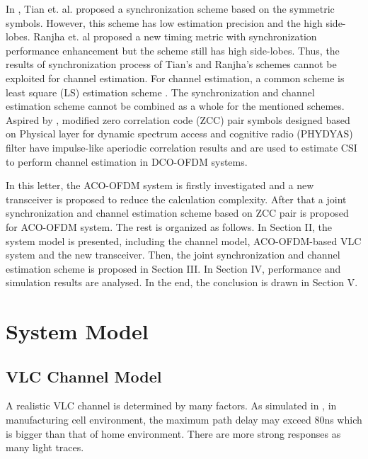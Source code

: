 \documentclass[10pt,journal]{IEEEtran}
\begin{document}
In \cite{Tian2008}, Tian et. al. proposed a synchronization scheme based on the symmetric symbols. However, this scheme has low estimation precision and the high side-lobes. Ranjha et. al \cite{Ranjha2015} proposed a new timing metric with synchronization performance enhancement but the scheme still has high side-lobes. Thus, the results of synchronization process of Tian's and Ranjha's schemes cannot be exploited for channel estimation. For channel estimation, a common scheme is least square (LS) estimation scheme \cite{wu2016channel}.
The synchronization and channel estimation scheme cannot be combined as a whole for the mentioned schemes.
Aspired by \cite{Qian2017}, modified zero correlation code (ZCC) pair symbols designed based on Physical layer for dynamic spectrum access and cognitive radio (PHYDYAS) \cite{Bellanger2010} filter have impulse-like aperiodic correlation results and are used to estimate CSI to perform channel estimation in DCO-OFDM systems. %

In this letter, the ACO-OFDM system is firstly investigated and a new transceiver is proposed to reduce the calculation complexity. After that a joint synchronization and channel estimation scheme based on ZCC pair is proposed for ACO-OFDM system.
The rest is organized as follows. In Section II, the system model is presented, including the channel model, ACO-OFDM-based VLC system and the new transceiver. Then, the joint synchronization and channel estimation scheme is proposed in Section III. In Section IV, performance and simulation results are analysed. In the end, the conclusion is drawn in Section V.

\section{System Model}

	\subsection{VLC Channel Model}
		A realistic VLC channel is determined by many factors. As simulated in \cite{Uysal2015Lifi}, in manufacturing cell environment, the maximum path delay may exceed 80ns which is bigger than that of home environment.
There are more strong responses as many light traces.
\end{document}
